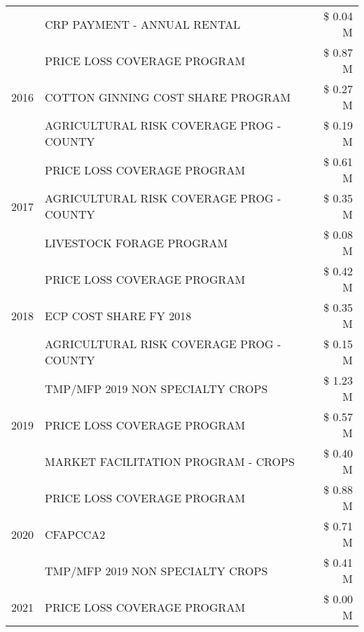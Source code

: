 \begin{tabular}{llr}
 & CRP PAYMENT - ANNUAL RENTAL & \$ 0.04 M \\
\cline{1-3}
\multirow[t]{3}{*}{2016} & PRICE LOSS COVERAGE PROGRAM                   & \$ 0.87 M \\
 & COTTON GINNING COST SHARE PROGRAM             & \$ 0.27 M \\
 & AGRICULTURAL RISK COVERAGE PROG - COUNTY      & \$ 0.19 M \\
\cline{1-3}
\multirow[t]{3}{*}{2017} & PRICE LOSS COVERAGE PROGRAM & \$ 0.61 M \\
 & AGRICULTURAL RISK COVERAGE PROG - COUNTY & \$ 0.35 M \\
 & LIVESTOCK FORAGE PROGRAM & \$ 0.08 M \\
\cline{1-3}
\multirow[t]{3}{*}{2018} & PRICE LOSS COVERAGE PROGRAM & \$ 0.42 M \\
 & ECP COST SHARE FY 2018 & \$ 0.35 M \\
 & AGRICULTURAL RISK COVERAGE PROG - COUNTY & \$ 0.15 M \\
\cline{1-3}
\multirow[t]{3}{*}{2019} & TMP/MFP 2019 NON SPECIALTY CROPS & \$ 1.23 M \\
 & PRICE LOSS COVERAGE PROGRAM & \$ 0.57 M \\
 & MARKET FACILITATION PROGRAM - CROPS & \$ 0.40 M \\
\cline{1-3}
\multirow[t]{3}{*}{2020} & PRICE LOSS COVERAGE PROGRAM & \$ 0.88 M \\
 & CFAPCCA2 & \$ 0.71 M \\
 & TMP/MFP 2019 NON SPECIALTY CROPS & \$ 0.41 M \\
\cline{1-3}
2021 & PRICE LOSS COVERAGE PROGRAM & \$ 0.00 M \\
\cline{1-3}
\bottomrule
\end{tabular}
